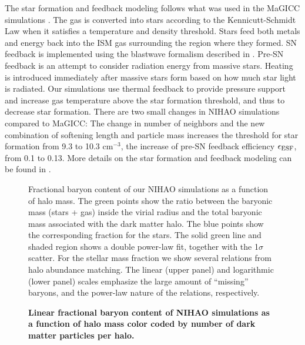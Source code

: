 \documentclass[useAMS,usenatbib]{mn2e}
\begin{document}
The star formation and feedback modeling follows what was used in the
MaGICC simulations \citep{Stinson13}.   The gas is converted into
  stars according to the Kennicutt-Schmidt Law when it satisfies a
  temperature and density threshold. Stars feed both metals and energy
  back into the ISM gas surrounding the region where they formed. SN
  feedback is implemented using the blastwave formalism described in
  \citet{Stinson06}. Pre-SN feedback is an attempt to consider
  radiation energy from massive stars. Heating is introduced
  immediately after massive stars form based on how much star light is
  radiated.  Our simulations use thermal feedback to provide pressure
  support and  increase gas temperature above the star formation
  threshold, and thus to decrease star formation.  There are two
small changes in NIHAO simulations compared to MaGICC:
The change in  number of neighbors
and the new combination of softening length and  particle mass
increases the threshold for star formation from  9.3 to 10.3
cm$^{-3}$, the increase of pre-SN feedback efficiency $\epsilon_{\rm
  ESF}$, from 0.1 to 0.13.  More details on the star formation and
feedback modeling can be found in \citet{Wang15}.


\begin{figure}
\centerline{
}
\caption{Fractional baryon content of our NIHAO simulations  as a
  function of halo mass. The green points show the ratio between the
  baryonic mass (stars + gas) inside the virial radius and the total
  baryonic mass associated with the dark matter halo. The blue points
  show the corresponding fraction for the stars. The solid green line
  and shaded region shows a double power-law fit, together with the
  1$\sigma$ scatter. For the stellar mass fraction we show several
  relations from halo abundance matching.    The linear (upper panel)
  and logarithmic (lower panel) scales emphasize the large amount of
  ``missing'' baryons, and the power-law nature of the relations,
  respectively.}
\label{fig:budget}
\end{figure}

\begin{figure*}
\centerline{
}
\caption{{\bf Linear fractional baryon content of NIHAO
simulations as a function of halo mass color coded by
number of dark matter particles per halo.}}
\label{fig:budget_res}
\end{figure*}
\end{document}
